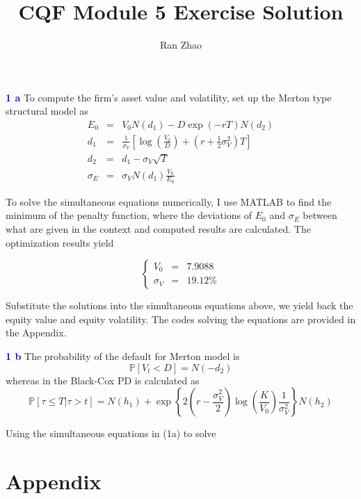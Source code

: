 \documentclass[a4paper,11pt] {article}
\author{Ran Zhao}
\title{CQF Module 5 Exercise Solution}
\date{}
\begin{document}
\maketitle


\textcolor{blue}{\bf 1 a} To compute the firm's asset value and volatility, set up the Merton type structural model as
\begin{eqnarray*}
E_0 &=& V_0  N(d_1) - D \exp (-rT) N(d_2) \\
d_1 &=& \frac{1}{\sigma_V} \left[ \log \left(\frac{V_0}{D} \right) + \left( r + \frac{1}{2}\sigma_V^2 \right) T \right] \\
d_2 &=& d_1 - \sigma_V \sqrt{T} \\
\sigma_E &=& \sigma_V N(d_1) \frac{V_0}{E_0}
\end{eqnarray*}

To solve the simultaneous equations numerically, I use MATLAB to find the minimum of the penalty function, where the deviations of $E_0$ and $\sigma_E$ between what are given in the context and computed results are calculated. The optimization results yield

$$ \left\{
\begin{aligned}
V_0 &=& 7.9088 \\
\sigma_V &=& 19.12\%
\end{aligned}
\right.
$$

Substitute the solutions into the simultaneous equations above, we yield back the equity value and equity volatility. The codes solving the equations are provided in the Appendix.

\bigskip

\textcolor{blue}{\bf 1 b} The probability of the default for Merton model is
$$
\mathbb{P}[V_t < D] = N(-d_2)
$$
whereas in the Black-Cox PD is calculated as
$$
\mathbb{P}[\tau \leq T | \tau > t] = N(h_1) + \exp\left\{ 2\left(r-\frac{\sigma_V^2}{2}\right) \log\left( \frac{K}{V_0} \right) \frac{1}{\sigma_V^2} \right\} N(h_2)
$$

Using the simultaneous equations in (1a) to solve  




\section*{Appendix}
\begin{spacing}{0.9}


\end{spacing}
\end{document}
